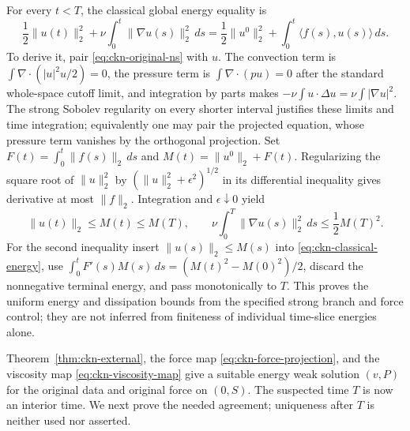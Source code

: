 For every $t<T$, the classical global energy equality is
\begin{equation}\label{eq:ckn-classical-energy}
 \frac12\|u(t)\|_2^2+\nu\int_0^t\|\nabla u(s)\|_2^2\,ds
 =\frac12\|u^0\|_2^2+\int_0^t\langle f(s),u(s)\rangle\,ds.
\end{equation}
To derive it, pair \eqref{eq:ckn-original-ns} with $u$.
The convection term is $\int\nabla\cdot(|u|^2u/2)=0$,
the pressure term is $\int\nabla\cdot(pu)=0$ after the standard
whole-space cutoff limit, and integration by parts makes
$-\nu\int u\cdot\Delta u=\nu\int|\nabla u|^2$.
The strong Sobolev regularity on every shorter interval justifies these
limits and time integration; equivalently one may pair the projected
equation, whose pressure term vanishes by the orthogonal projection.
Set $F(t)=\int_0^t\|f(s)\|_2\,ds$ and $M(t)=\|u^0\|_2+F(t)$.
Regularizing the square root of $\|u\|_2^2$ by
$(\|u\|_2^2+\epsilon^2)^{1/2}$ in its differential inequality gives
derivative at most $\|f\|_2$. Integration and
$\epsilon\downarrow0$ yield
\begin{equation}\label{eq:ckn-uniform-energy}
 \|u(t)\|_2\leq M(t)\leq M(T),\qquad
 \nu\int_0^T\|\nabla u(s)\|_2^2\,ds\leq\frac12M(T)^2.
\end{equation}
For the second inequality insert $\|u(s)\|_2\leq M(s)$ into
\eqref{eq:ckn-classical-energy}, use
$\int_0^t F'(s)M(s)\,ds=(M(t)^2-M(0)^2)/2$, discard the nonnegative
terminal energy, and pass monotonically to $T$.
This proves the uniform energy and dissipation bounds from the specified
strong branch and force control; they are not inferred from finiteness
of individual time-slice energies alone.

Theorem~\ref{thm:ckn-external}, the force map
\eqref{eq:ckn-force-projection}, and the viscosity map
\eqref{eq:ckn-viscosity-map} give a suitable energy weak solution
$(v,P)$ for the original data and original force on $(0,S)$.
The suspected time $T$ is now an interior time. We next prove the needed
agreement; uniqueness after $T$ is neither used nor asserted.

